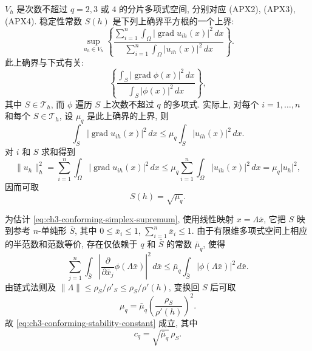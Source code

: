 \begin{Proof}
$V_h$ 是次数不超过 $q=2,3$ 或 $4$ 的分片多项式空间, 分别对应 (APX2), (APX3), (APX4). 稳定性常数 $S(h)$ 是下列上确界平方根的一个上界:
\begin{equation}
\sup_{u_h\in V_h}
\left\{\frac{\displaystyle\sum_{i=1}^n\int_\Omega|\operatorname{grad}u_{ih}(x)|^2\,dx}
{\displaystyle\sum_{i=1}^n\int_\Omega|u_{ih}(x)|^2\,dx}\right\}.
\label{eq:ch3-conforming-inverse-supremum}
\end{equation}
此上确界与下式有关:
\begin{equation}
\left\{\frac{\displaystyle\int_S|\operatorname{grad}\phi(x)|^2\,dx}
{\displaystyle\int_S|\phi(x)|^2\,dx}\right\},
\label{eq:ch3-conforming-simplex-supremum}
\end{equation}
其中 $S\in\mathcal T_h$, 而 $\phi$ 遍历 $S$ 上次数不超过 $q$ 的多项式. 实际上, 对每个 $i=1,\ldots,n$ 和每个 $S\in\mathcal T_h$, 设 $\mu_q$ 是此上确界的上界, 则
\[
\int_S|\operatorname{grad}u_{ih}(x)|^2\,dx
\leq\mu_q\int_S|u_{ih}(x)|^2\,dx.
\]
对 $i$ 和 $S$ 求和得到
\begin{equation}
\lVert u_h\rVert_h^2
=\sum_{i=1}^n\int_\Omega|\operatorname{grad}u_{ih}(x)|^2\,dx
\leq\mu_q\sum_{i=1}^n\int_\Omega|u_{ih}(x)|^2\,dx
=\mu_q|u_h|^2,
\label{eq:ch3-conforming-inverse-estimate}
\end{equation}
因而可取
\begin{equation}
S(h)=\sqrt{\mu_q}.
\label{eq:ch3-conforming-sqrt-muq}
\end{equation}

\hypertarget{chapter-03-page-269}{}
为估计 \eqref{eq:ch3-conforming-simplex-supremum}, 使用线性映射 $x=\Lambda\bar x$, 它把 $S$ 映到参考 $n$-单纯形 $\bar S$, 其中 $0\leq\bar x_i\leq1$, $\sum_{i=1}^n\bar x_i\leq1$. 由于有限维多项式空间上相应的半范数和范数等价, 存在仅依赖于 $q$ 和 $\bar S$ 的常数 $\bar\mu_q$, 使得
\begin{equation}
\sum_{j=1}^n\int_{\bar S}\left|\frac{\partial}{\partial\bar x_j}\phi(\Lambda\bar x)\right|^2\,d\bar x
\leq\bar\mu_q\int_{\bar S}|\phi(\Lambda\bar x)|^2\,d\bar x.
\label{eq:ch3-conforming-reference-inverse-estimate}
\end{equation}
由链式法则及 $\lVert\Lambda\rVert\leq\rho_S/\rho'_S\leq\rho_S/\rho'(h)$, 变换回 $S$ 后可取
\[
\mu_q=\bar\mu_q\left(\frac{\rho_S}{\rho'(h)}\right)^2.
\]
故 \eqref{eq:ch3-conforming-stability-constant} 成立, 其中
\begin{equation}
c_q=\sqrt{\bar\mu_q}\,\rho_S.
\label{eq:ch3-conforming-cq}
\end{equation}
\end{Proof}

